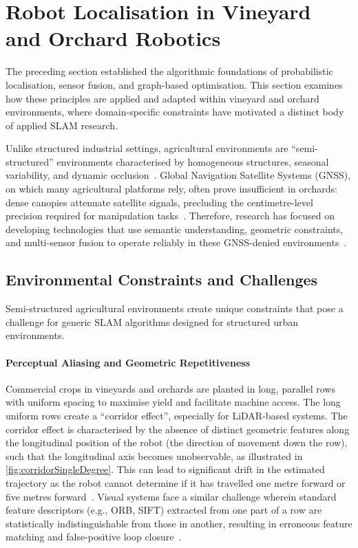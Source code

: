 \section{Robot Localisation in Vineyard and Orchard Robotics}
\label{sec:vineyard-robotics}

The preceding section established the algorithmic foundations of probabilistic localisation, sensor fusion, and graph-based optimisation. This section examines how these principles are applied and adapted within vineyard and orchard environments, where domain-specific constraints have motivated a distinct body of applied SLAM research.

Unlike structured industrial settings, agricultural environments are ``semi-structured'' environments characterised by homogeneous structures, seasonal variability, and dynamic occlusion~\cite{hroobBenchmarkVisual3D2021}. Global Navigation Satellite Systems (GNSS), on which many agricultural platforms rely, often prove insufficient in orchards: dense canopies attenuate satellite signals, precluding the centimetre-level precision required for manipulation tasks~\cite{tangFruitTreeMappingSystem2024}. Therefore, research has focused on developing technologies that use semantic understanding, geometric constraints, and multi-sensor fusion to operate reliably in these GNSS-denied environments~\cite{tangFruitTreeMappingSystem2024}.

\subsection{Environmental Constraints and Challenges}
\label{subsec:env-constraints}
Semi-structured agricultural environments create unique constraints that pose a challenge for generic SLAM algorithms designed for structured urban environments. 

\paragraph{Perceptual Aliasing and Geometric Repetitiveness}

Commercial crops in vineyards and orchards are planted in long, parallel rows with uniform spacing to maximise yield and facilitate machine access. The long uniform rows create a ``corridor effect'', especially for LiDAR-based systems. The corridor effect is characterised by the absence of distinct geometric features along the longitudinal position of the robot (the direction of movement down the row), such that the longitudinal axis becomes unobservable, as illustrated in \cref{fig:corridorSingleDegree}. This can lead to significant drift in the estimated trajectory as the robot cannot determine if it has travelled one metre forward or five metres forward~\cite{khanReviewSLAMTechniques2025}. Visual systems face a similar challenge wherein standard feature descriptors (e.g., ORB, SIFT) extracted from one part of a row are statistically indistinguishable from those in another, resulting in erroneous feature matching and false-positive loop closure~\cite{papadimitriouLoopClosureDetection2022}.

